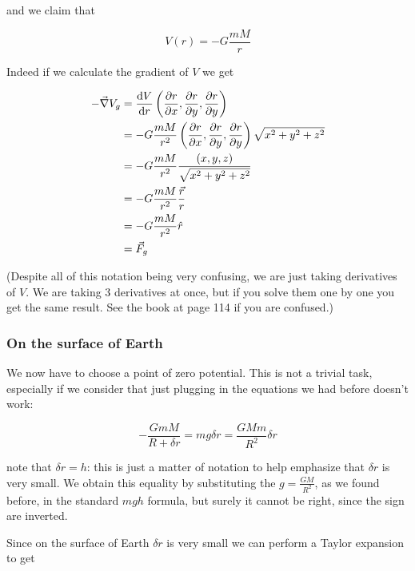 \documentclass[10pt]{extarticle}
\begin{document}
and we claim that

$$
    V(r) = - G \frac{m M}{r}
$$

Indeed if we calculate the gradient of $V$ we get

\begin{align*}
    - \vec \nabla V_g & = \dv{V}{r} \left(\pdv{r}{x},\pdv{r}{y},\pdv{r}{y} \right)                                  \\
                      & = - G \frac{m M}{r^2} \left(\pdv{r}{x},\pdv{r}{y},\pdv{r}{y} \right) \sqrt{x^2 + y^2 + z^2} \\
                      & = - G \frac{m M}{r^2} \frac{(x, y, z)}{\sqrt{x^2 + y^2 + z^2}}                              \\
                      & = - G \frac{m M}{r^2} \frac{\vec r}{r}                                                      \\
                      & = - G \frac{m M}{r^2} \hat r                                                                \\
                      & = \vec F_g
\end{align*}

(Despite all of this notation being very confusing, we are just taking derivatives of $V$. We are taking 3 derivatives at once, but if you solve them one by one you get the same result. See the book at page 114 if you are confused.)

\subsubsection{On the surface of Earth}

We now have to choose a point of zero potential. This is not a trivial task, especially if we consider that just plugging in the equations we had before doesn't work:

$$
    - \frac{G m M}{R + \delta r} = m g \delta r = \frac{G M m}{R^2} \delta r
$$

note that $\delta r = h$: this is just a matter of notation to help emphasize that $\delta r$ is very small.
We obtain this equality by substituting the $g = \frac{GM}{R^2}$, as we found before, in the standard $mgh$ formula, but surely it cannot be right, since the sign are inverted.

Since on the surface of Earth $\delta r$ is very small we can perform a Taylor expansion to get
\end{document}
